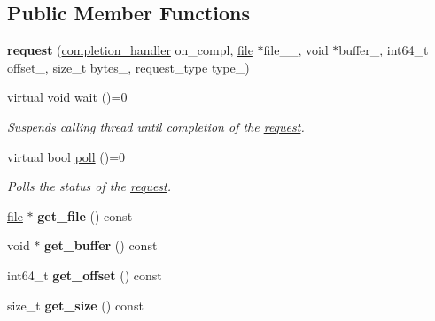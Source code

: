 \subsection*{Public Member Functions}
\begin{CompactItemize}
\item 
\hypertarget{group__iolayer_g31f7e409bd2e9ade994975b3752f33d1}{
\textbf{request} (\hyperlink{classcompletion__handler}{completion\_\-handler} on\_\-compl, \hyperlink{classfile}{file} $\ast$file\_\-\_\-, void $\ast$buffer\_\-, int64\_\-t offset\_\-, size\_\-t bytes\_\-, request\_\-type type\_\-)}
\label{group__iolayer_g31f7e409bd2e9ade994975b3752f33d1}

\item 
\hypertarget{group__iolayer_g2cdb5763d21b553ae816eb4152e5d89b}{
virtual void \hyperlink{group__iolayer_g2cdb5763d21b553ae816eb4152e5d89b}{wait} ()=0}
\label{group__iolayer_g2cdb5763d21b553ae816eb4152e5d89b}

\begin{CompactList}\small\item\em Suspends calling thread until completion of the \hyperlink{classrequest}{request}. \item\end{CompactList}\item 
virtual bool \hyperlink{group__iolayer_ge93809a6f19558a9f0f98f50cd69aa2f}{poll} ()=0
\begin{CompactList}\small\item\em Polls the status of the \hyperlink{classrequest}{request}. \item\end{CompactList}\item 
\hypertarget{group__iolayer_g1791fb9aa3161faec8b1660e01525e26}{
\hyperlink{classfile}{file} $\ast$ \textbf{get\_\-file} () const }
\label{group__iolayer_g1791fb9aa3161faec8b1660e01525e26}

\item 
\hypertarget{group__iolayer_gbc0add4ffc5e7c696ed4067cf630d935}{
void $\ast$ \textbf{get\_\-buffer} () const }
\label{group__iolayer_gbc0add4ffc5e7c696ed4067cf630d935}

\item 
\hypertarget{group__iolayer_gd8cb0dcaea77815e50f9d9f55b84db27}{
int64\_\-t \textbf{get\_\-offset} () const }
\label{group__iolayer_gd8cb0dcaea77815e50f9d9f55b84db27}

\item 
\hypertarget{group__iolayer_ge19716d99090239ece78660b0c7d567f}{
size\_\-t \textbf{get\_\-size} () const }
\label{group__iolayer_ge19716d99090239ece78660b0c7d567f}


\end{CompactItemize}
